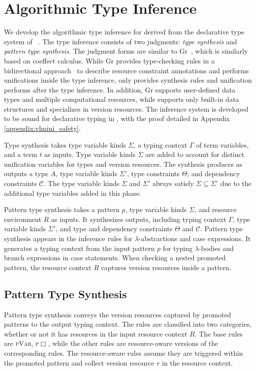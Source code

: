 \section{Algorithmic Type Inference}
\label{inference}

We develop the algorithmic type inference for \vlmini{} derived from the declarative type system of \corelang{}~\cite{Tanabe:2018:CPA:3242921.3242923,Tanabe_2021}.
The type inference consists of two judgments: \emph{type synthesis} and \emph{pattern type synthesis}.
The judgment forms are similar to Gr~\cite{Orchard:2019:Granule}, which is similarly based on coeffect calculus.
While Gr provides type-checking rules in a bidirectional approach~\cite{10.1145/2544174.2500582,10.1145/3290322} to describe resource constraint annotations and performs unifications inside the type inference, \vlmini{} only provides synthesis rules and unification performs after the type inference.
In addition, Gr supports user-defined data types and multiple computational resources, while \vlmini{} supports only built-in data structures and specializes in version resources.
The inference system is developed to be sound for declarative typing in \corelang{}, with the proof detailed in Appendix \ref{appendix:vlmini_safety}.

Type synthesis takes type variable kinds $\Sigma$, a typing context $\Gamma$ of term variables, and a term $t$ as inputs. Type variable kinds $\Sigma$ are added to account for distinct unification variables for types and version resources.
The synthesis produces as outputs a type $A$, type variable kinds $\Sigma'$, type constraints $\Theta$, and dependency constraints $\mathcal{C}$.
The type variable kinds $\Sigma$ and $\Sigma'$ always satisfy $\Sigma \subseteq \Sigma'$ due to the additional type variables added in this phase.

Pattern type synthesis takes a pattern $p$, type variable kinds $\Sigma$, and resource environment $R$ as inputs. It synthesizes outputs, including typing context $\Gamma$, type variable kinds $\Sigma'$, and type and dependency constraints $\Theta$ and $\mathcal{C}$.
Pattern type synthesis appears in the inference rules for $\lambda$-abstractions and case expressions. It generates a typing context from the input pattern $p$ for typing $\lambda$-bodies and branch expressions in case statements.
When checking a nested promoted pattern, the resource context $R$ captures version resources inside a pattern.

\subsection{Pattern Type Synthesis}
% 
Pattern type synthesis conveys the version resources captured by promoted patterns to the output typing context. The rules are classified into two categories, whether or not it has resources in the input resource context $R$. The base rules are \textsc{pVar}, \textsc{p}$\Box$, while the other rules are resource-aware versions of the corresponding rules. The resource-aware rules assume they are triggered within the promoted pattern and collect version resource $r$ in the resource context.

